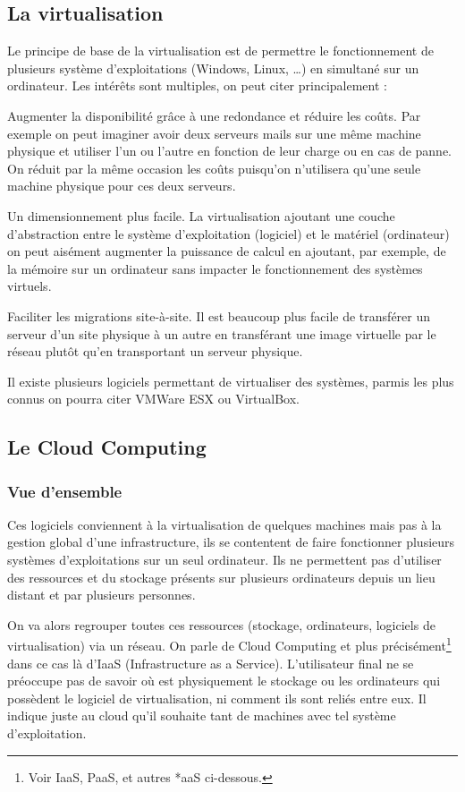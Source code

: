 \documentclass{report}
\begin{document}
\subsection{La virtualisation}
Le principe de base de la virtualisation est de permettre le fonctionnement de plusieurs système d’exploitations (Windows, Linux, …) en simultané sur un ordinateur.
Les intérêts sont multiples, on peut citer principalement :\newline

Augmenter la disponibilité grâce à une redondance et réduire les coûts. Par exemple on peut imaginer avoir deux serveurs mails sur une même machine physique et utiliser l’un ou l’autre en fonction de leur charge ou en cas de panne. On réduit par la même occasion les coûts puisqu’on n’utilisera qu’une seule machine physique pour ces deux serveurs.

Un dimensionnement plus facile. La virtualisation ajoutant une couche d’abstraction entre le système d’exploitation (logiciel) et le matériel (ordinateur) on peut aisément augmenter la puissance de calcul en ajoutant, par exemple, de la mémoire sur un ordinateur sans impacter le fonctionnement des systèmes virtuels.

Faciliter les migrations site-à-site. Il est beaucoup plus facile de transférer un serveur d’un site physique à un autre en transférant une image virtuelle par le réseau plutôt qu’en transportant un serveur physique.\newline

Il existe plusieurs logiciels permettant de virtualiser des systèmes, parmis les plus connus on pourra citer VMWare ESX ou VirtualBox.

\subsection{Le Cloud Computing}
\subsubsection{Vue d'ensemble}
Ces logiciels conviennent à la virtualisation de quelques machines mais pas à la gestion global d'une infrastructure, ils se contentent de faire fonctionner plusieurs systèmes d’exploitations sur un seul ordinateur. Ils ne permettent pas d'utiliser des ressources et du stockage présents sur plusieurs ordinateurs depuis un lieu distant et par plusieurs personnes.

On va alors regrouper toutes ces ressources (stockage, ordinateurs, logiciels de virtualisation) via un réseau. On parle de Cloud Computing et plus précisément\footnote{Voir \og IaaS, PaaS, et autres *aaS \fg ci-dessous.} dans ce cas là d’IaaS (Infrastructure as a Service).
L’utilisateur final ne se préoccupe pas de savoir où est physiquement le stockage ou les ordinateurs qui possèdent le logiciel de virtualisation, ni comment ils sont reliés entre eux. Il indique juste au cloud qu’il souhaite tant de machines avec tel système d’exploitation.
\end{document}
